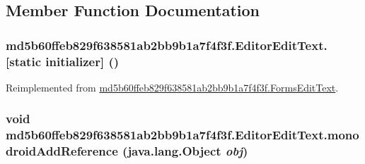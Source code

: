 \subsection{Member Function Documentation}
\hypertarget{classmd5b60ffeb829f638581ab2bb9b1a7f4f3f_1_1_editor_edit_text_3a913e8148e4f4e1aba30b8717b86dc3}{
\subsubsection[{[static initializer]}]{\setlength{\rightskip}{0pt plus 5cm}md5b60ffeb829f638581ab2bb9b1a7f4f3f.EditorEditText.\mbox{[}static initializer\mbox{]} ()}}
\label{classmd5b60ffeb829f638581ab2bb9b1a7f4f3f_1_1_editor_edit_text_3a913e8148e4f4e1aba30b8717b86dc3}




Reimplemented from \hyperlink{classmd5b60ffeb829f638581ab2bb9b1a7f4f3f_1_1_forms_edit_text_ebbff071dc8577936adfdc4ac285f1db}{md5b60ffeb829f638581ab2bb9b1a7f4f3f.FormsEditText}.\hypertarget{classmd5b60ffeb829f638581ab2bb9b1a7f4f3f_1_1_editor_edit_text_2d346ebbcec03d19cb05949a57c42ca2}{
\subsubsection[{monodroidAddReference}]{\setlength{\rightskip}{0pt plus 5cm}void md5b60ffeb829f638581ab2bb9b1a7f4f3f.EditorEditText.monodroidAddReference (java.lang.Object {\em obj})}}
\label{classmd5b60ffeb829f638581ab2bb9b1a7f4f3f_1_1_editor_edit_text_2d346ebbcec03d19cb05949a57c42ca2}




